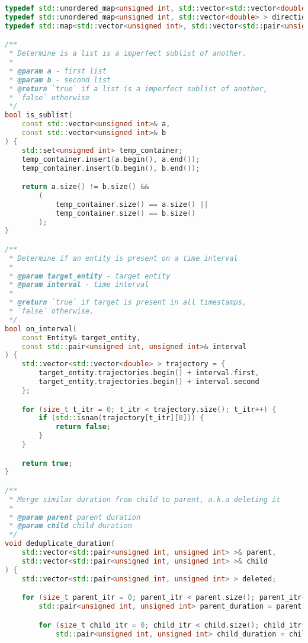 \begin{lstlisting}[language=C++, caption=Implementasi fungsi \texttt{identify\_rombongan}, label={lamp:identify-rombongan}]
typedef std::unordered_map<unsigned int, std::vector<std::vector<double> > > trajectory_map;
typedef std::unordered_map<unsigned int, std::vector<double> > direction_map;
typedef std::map<std::vector<unsigned int>, std::vector<std::pair<unsigned int, unsigned int> > > rombongan_lifespan;

/**
 * Determine is a list is a imperfect sublist of another.
 *
 * @param a - first list
 * @param b - second list
 * @return `true` if a list is a imperfect sublist of another,
 * `false` otherwise
 */
bool is_sublist(
    const std::vector<unsigned int>& a,
    const std::vector<unsigned int>& b
) {
    std::set<unsigned int> temp_container;
    temp_container.insert(a.begin(), a.end());
    temp_container.insert(b.begin(), b.end());

    return a.size() != b.size() &&
        (
            temp_container.size() == a.size() ||
            temp_container.size() == b.size()
        );
}

/**
 * Determine if an entity is present on a time interval
 * 
 * @param target_entity - target entity
 * @param interval - time interval
 * 
 * @return `true` if target is present in all timestamps,
 * `false` otherwise.
 */
bool on_interval(
    const Entity& target_entity,
    const std::pair<unsigned int, unsigned int>& interval
) {
    std::vector<std::vector<double> > trajectory = {
        target_entity.trajectories.begin() + interval.first,
        target_entity.trajectories.begin() + interval.second
    };

    for (size_t t_itr = 0; t_itr < trajectory.size(); t_itr++) {
        if (std::isnan(trajectory[t_itr][0])) {
            return false;
        }
    }

    return true;
}

/**
 * Merge similar duration from child to parent, a.k.a deleting it
 * 
 * @param parent parent duration
 * @param child child duration
 */
void deduplicate_duration(
    std::vector<std::pair<unsigned int, unsigned int> >& parent,
    std::vector<std::pair<unsigned int, unsigned int> >& child
) {
    std::vector<std::pair<unsigned int, unsigned int> > deleted;

    for (size_t parent_itr = 0; parent_itr < parent.size(); parent_itr++) {
        std::pair<unsigned int, unsigned int> parent_duration = parent[parent_itr];

        for (size_t child_itr = 0; child_itr < child.size(); child_itr++) {
            std::pair<unsigned int, unsigned int> child_duration = child[child_itr];


\end{lstlisting}
